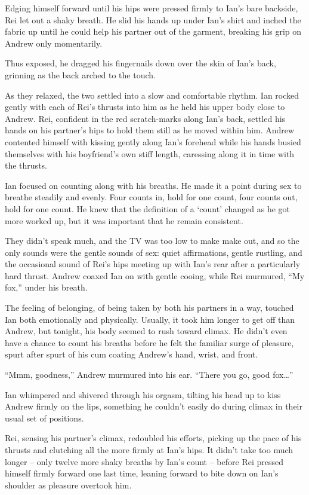 Edging himself forward until his hips were pressed firmly to Ian's bare backside, Rei let out a shaky breath. He slid his hands up under Ian's shirt and inched the fabric up until he could help his partner out of the garment, breaking his grip on Andrew only momentarily.

Thus exposed, he dragged his fingernails down over the skin of Ian's back, grinning as the back arched to the touch.

As they relaxed, the two settled into a slow and comfortable rhythm. Ian rocked gently with each of Rei's thrusts into him as he held his upper body close to Andrew. Rei, confident in the red scratch-marks along Ian's back, settled his hands on his partner's hips to hold them still as he moved within him. Andrew contented himself with kissing gently along Ian's forehead while his hands busied themselves with his boyfriend's own stiff length, caressing along it in time with the thrusts.

Ian focused on counting along with his breaths. He made it a point during sex to breathe steadily and evenly. Four counts in, hold for one count, four counts out, hold for one count. He knew that the definition of a `count' changed as he got more worked up, but it was important that he remain consistent.

They didn't speak much, and the TV was too low to make make out, and so the only sounds were the gentle sounds of sex: quiet affirmations, gentle rustling, and the occasional sound of Rei's hips meeting up with Ian's rear after a particularly hard thrust. Andrew coaxed Ian on with gentle cooing, while Rei murmured, ``My fox,'' under his breath.

The feeling of belonging, of being taken by both his partners in a way, touched Ian both emotionally and physically. Usually, it took him longer to get off than Andrew, but tonight, his body seemed to rush toward climax. He didn't even have a chance to count his breaths before he felt the familiar surge of pleasure, spurt after spurt of his cum coating Andrew's hand, wrist, and front.

``Mmm, goodness,'' Andrew murmured into his ear. ``There you go, good fox\ldots{}''

Ian whimpered and shivered through his orgasm, tilting his head up to kiss Andrew firmly on the lips, something he couldn't easily do during climax in their usual set of positions.

Rei, sensing his partner's climax, redoubled his efforts, picking up the pace of his thrusts and clutching all the more firmly at Ian's hips. It didn't take too much longer -- only twelve more shaky breaths by Ian's count -- before Rei pressed himself firmly forward one last time, leaning forward to bite down on Ian's shoulder as pleasure overtook him.


